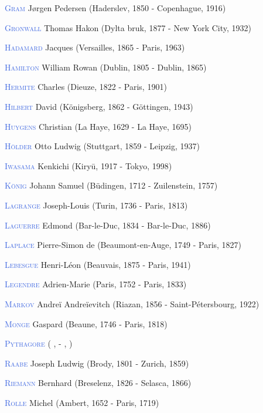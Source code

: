 \item \textcolor{RoyalBlue}{\textsc{Gram}} Jørgen Pedersen (Haderslev, 1850 - Copenhague, 1916)
\item \textcolor{RoyalBlue}{\textsc{Gronwall}} Thomas Hakon (Dylta bruk, 1877 - New York City, 1932)
\item \textcolor{RoyalBlue}{\textsc{Hadamard}} Jacques (Versailles, 1865 - Paris, 1963)
\item \textcolor{RoyalBlue}{\textsc{Hamilton}} William Rowan (Dublin, 1805 - Dublin, 1865)
\item \textcolor{RoyalBlue}{\textsc{Hermite}} Charles (Dieuze, 1822 - Paris, 1901)
\item \textcolor{RoyalBlue}{\textsc{Hilbert}} David  (Königsberg, 1862 - Göttingen, 1943)
\item \textcolor{RoyalBlue}{\textsc{Huygens}} Christian (La Haye, 1629 - La Haye, 1695)
\item \textcolor{RoyalBlue}{\textsc{Hölder}} Otto Ludwig (Stuttgart, 1859 - Leipzig, 1937)
\item \textcolor{RoyalBlue}{\textsc{Iwasama}} Kenkichi (Kiryū, 1917 - Tokyo, 1998)
\item \textcolor{RoyalBlue}{\textsc{König}} Johann Samuel (Büdingen, 1712 - Zuilenstein, 1757)
\item \textcolor{RoyalBlue}{\textsc{Lagrange}} Joseph-Louis (Turin, 1736 - Paris, 1813)
\item \textcolor{RoyalBlue}{\textsc{Laguerre}} Edmond (Bar-le-Duc, 1834 - Bar-le-Duc, 1886)
\item \textcolor{RoyalBlue}{\textsc{Laplace}} Pierre-Simon de (Beaumont-en-Auge, 1749 - Paris, 1827)
\item \textcolor{RoyalBlue}{\textsc{Lebesgue}} Henri-Léon (Beauvais, 1875 - Paris, 1941)
\item \textcolor{RoyalBlue}{\textsc{Legendre}} Adrien-Marie (Paris, 1752 - Paris, 1833)
\item \textcolor{RoyalBlue}{\textsc{Markov}} Andreï Andreïevitch (Riazan, 1856 - Saint-Pétersbourg, 1922)
\item \textcolor{RoyalBlue}{\textsc{Monge}} Gaspard (Beaune, 1746 - Paris, 1818)
\item \textcolor{RoyalBlue}{\textsc{Pythagore}}   ( ,   -  ,  )
\item \textcolor{RoyalBlue}{\textsc{Raabe}} Joseph Ludwig  (Brody, 1801 - Zurich, 1859)
\item \textcolor{RoyalBlue}{\textsc{Riemann}} Bernhard (Breselenz, 1826 - Selasca, 1866)
\item \textcolor{RoyalBlue}{\textsc{Rolle}} Michel (Ambert, 1652 - Paris, 1719)
